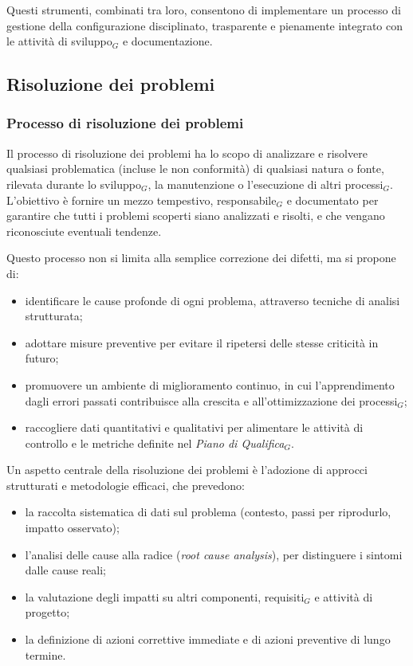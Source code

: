 \documentclass[a4paper, 10pt]{article}
\begin{document}
Questi strumenti, combinati tra loro, consentono di implementare un processo di gestione della configurazione disciplinato, trasparente e pienamente integrato con le attività di sviluppo$_G$ e documentazione.

\subsection{Risoluzione dei problemi}
\label{subsec:risoluzione_problemi}

\subsubsection{Processo di risoluzione dei problemi}
\label{subsubsec:processo_risoluzione}

Il processo di risoluzione dei problemi ha lo scopo di analizzare e risolvere qualsiasi problematica (incluse le non conformità) di qualsiasi natura o fonte, rilevata durante lo sviluppo$_G$, la manutenzione o l'esecuzione di altri processi$_G$. L'obiettivo è fornire un mezzo tempestivo, responsabile$_G$ e documentato per garantire che tutti i problemi scoperti siano analizzati e risolti, e che vengano riconosciute eventuali tendenze.

Questo processo non si limita alla semplice correzione dei difetti, ma si propone di:
\begin{itemize}
    \item identificare le cause profonde di ogni problema, attraverso tecniche di analisi strutturata;
    \item adottare misure preventive per evitare il ripetersi delle stesse criticità in futuro;
    \item promuovere un ambiente di miglioramento continuo, in cui l'apprendimento dagli errori passati contribuisce alla crescita e all'ottimizzazione dei processi$_G$;
    \item raccogliere dati quantitativi e qualitativi per alimentare le attività di controllo e le metriche definite nel \emph{Piano di Qualifica}$_G$.
\end{itemize}

Un aspetto centrale della risoluzione dei problemi è l'adozione di approcci strutturati e metodologie efficaci, che prevedono:
\begin{itemize}
    \item la raccolta sistematica di dati sul problema (contesto, passi per riprodurlo, impatto osservato);
    \item l'analisi delle cause alla radice (\emph{root cause analysis}), per distinguere i sintomi dalle cause reali;
    \item la valutazione degli impatti su altri componenti, requisiti$_G$ e attività di progetto;
    \item la definizione di azioni correttive immediate e di azioni preventive di lungo termine.
\end{itemize}
\end{document}
